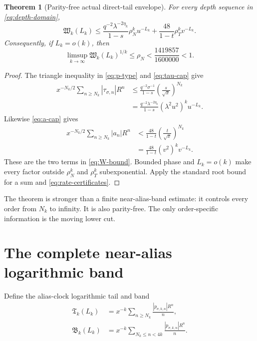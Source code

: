 \documentclass[11pt]{article}
\newtheorem{theorem}{Theorem}[section]
\theoremstyle{remark}
\begin{document}
\begin{theorem}[Parity-free actual direct-tail envelope]\label{thm:W}
For every depth sequence in \eqref{eq:depth-domain},
\begin{equation}\label{eq:W-bound}
 \boxed{
 \mathfrak W_k(L_k)
 \le
 \frac{q^{-2}\lambda^{-2\eta_k}}{1-s}
 \rho_N^ku^{-L_k}
 +\frac{48}{1-t}\rho_T^kv^{-L_k}.}
\end{equation}
Consequently, if $L_k=o(k)$, then
\begin{equation}\label{eq:W-root}
 \boxed{
 \limsup_{k\to\infty}\mathfrak W_k(L_k)^{1/k}
 \le\rho_N<\frac{1419857}{1600000}<1.}
\end{equation}
\end{theorem}

\begin{proof}
The triangle inequality in \eqref{eq:p-type} and \eqref{eq:tau-cap} give
\begin{align*}
 x^{-N_k/2}\sum_{n\ge N_k}|\tau_{\sigma,n}|R^n
 &\le \frac{q^{-2}\sigma^{-1}}{1-s}
       \left(\frac{s}{\sqrt x}\right)^{N_k}\\
 &=\frac{q^{-2}\lambda^{-2\eta_k}}{1-s}
   (\lambda^2u^2)^k u^{-L_k}.
\end{align*}
Likewise \eqref{eq:a-cap} gives
\begin{align*}
 x^{-N_k/2}\sum_{n\ge N_k}|a_n|R^n
 &<\frac{48}{1-t}
       \left(\frac{t}{\sqrt x}\right)^{N_k}\\
 &=\frac{48}{1-t}(v^2)^kv^{-L_k}.
\end{align*}
These are the two terms in \eqref{eq:W-bound}.  Bounded phase and
$L_k=o(k)$ make every factor outside $\rho_N^k$ and $\rho_T^k$
subexponential.  Apply the standard root bound for a sum and
\eqref{eq:rate-certificates}.
\end{proof}

The theorem is stronger than a finite near-alias-band estimate: it controls
every order from $N_k$ to infinity.  It is also parity-free.  The only
order-specific information is the moving lower cut.

\section{The complete near-alias logarithmic band}

Define the alias-clock logarithmic tail and band
\begin{align}
 \mathfrak T_k(L_k)
 &=x^{-k}\sum_{n\ge N_k}
   \frac{|p_{\sigma,k,n}|R^n}{n},
 \label{eq:T}\\
 \mathfrak B_k(L_k)
 &=x^{-k}\sum_{N_k\le n<4k}
   \frac{|p_{\sigma,k,n}|R^n}{n}.
 \label{eq:B}
\end{align}
\end{document}
